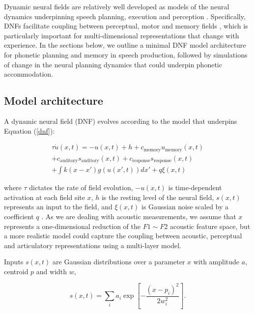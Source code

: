 \documentclass[10pt,letterpaper]{article}
\begin{document}
Dynamic neural fields are relatively well developed as models of the neural dynamics underpinning speech planning, execution and perception \citep[e.g.][]{gafos2006, kirkham-strycharczuk2024, roon-gafos2016, stern-shaw2023, tilsen2007, tilsen2019}. Specifically, DNFs facilitate coupling between perceptual, motor and memory fields \citep{erlhagen-schoener2002}, which is particularly important for multi-dimensional representations that change with experience. In the sections below, we outline a minimal DNF model architecture for phonetic planning and memory in speech production, followed by simulations of change in the neural planning dynamics that could underpin phonetic accommodation.

\subsection{Model architecture}

A dynamic neural field (DNF) evolves according to the \citet{amari1977} model that underpins Equation (\ref{dnf}):

\begin{multline}
\tau \dot{u}(x,t) = -u(x,t) + h + c_{\text{memory}} u_{\text{memory}}(x,t)
\\
+ c_{\text{auditory}} s_{\text{auditory}}(x,t) + c_{\text{response}}s_{\text{response}}(x,t)
\\
+ \int k(x-x') g(u(x',t))dx' + q\xi(x,t)
\label{dnf}
\end{multline}

where $\tau$ dictates the rate of field evolution, $-u(x,t)$ is time-dependent activation at each field site $x$, $h$ is the resting level of the neural field, $s(x,t)$ represents an input to the field, and $\xi(x,t)$ is Gaussian noise scaled by a coefficient $q$ \citep{schoener-etal2016}. As we are dealing with acoustic measurements, we assume that $x$ represents a one-dimensional reduction of the $F1\sim F2$ acoustic feature space, but a more realistic model could capture the coupling between acoustic, perceptual and articulatory representations using a multi-layer model.

Inputs $s(x,t)$ are Gaussian distributions over a parameter $x$ with amplitude $a$, centroid $p$ and width $w$,

\begin{equation}
s(x,t) = \sum_{i} a_{i} \exp \left[ - \frac{(x-p_{i})^2}{2w^2_{i}} \right].
\label{dnf_input}
\end{equation}
\end{document}
